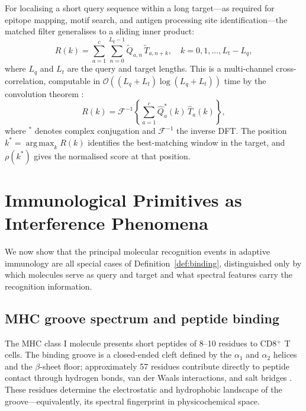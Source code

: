 \documentclass[twocolumn,11pt,a4paper]{article}
\theoremstyle{definition}
\theoremstyle{remark}
\DeclareMathOperator*{\argmax}{arg\,max}
\begin{document}
For localising a short query sequence within a long target---as required for
epitope mapping, motif search, and antigen processing site identification---the
matched filter generalises to a sliding inner product:
\begin{equation}
  R(k) = \sum_{a=1}^{c}\sum_{n=0}^{L_q-1}
    \widetilde{Q}_{a,n}\,\widetilde{T}_{a,n+k},
  \quad k = 0, 1, \ldots, L_t - L_q,
  \label{eq:sliding_filter}
\end{equation}
where $L_q$ and $L_t$ are the query and target lengths. This is a
multi-channel cross-correlation, computable in
$\mathcal{O}((L_q+L_t)\log(L_q+L_t))$ time by the convolution theorem
\citep{oppenheim2009}:
\begin{equation}
  R(k) = \mathcal{F}^{-1}\!\left\{
    \sum_{a=1}^{c} \widehat{Q}_{a}^*(k)\,\widehat{T}_{a}(k)
  \right\},
  \label{eq:cross_correlation_fft}
\end{equation}
where ${}^*$ denotes complex conjugation and $\mathcal{F}^{-1}$ the inverse
DFT. The position $k^* = \argmax_k R(k)$ identifies the best-matching window
in the target, and $\rho(k^*)$ gives the normalised score at that position.

\section{Immunological Primitives as Interference Phenomena}
\label{sec:immunological_primitives}

We now show that the principal molecular recognition events in adaptive
immunology are all special cases of Definition~\ref{def:binding},
distinguished only by which molecules serve as query and target and what
spectral features carry the recognition information.

\subsection{MHC groove spectrum and peptide binding}
\label{sec:mhc_binding}

The MHC class I molecule presents short peptides of 8--10 residues to
CD8$^+$ T cells. The binding groove is a closed-ended cleft defined by the
$\alpha_1$ and $\alpha_2$ helices and the $\beta$-sheet floor; approximately
57 residues contribute directly to peptide contact through hydrogen bonds,
van der Waals interactions, and salt bridges \citep{bjorkman1987}. These
residues determine the electrostatic and hydrophobic landscape of the
groove---equivalently, its spectral fingerprint in physicochemical space.
\end{document}
